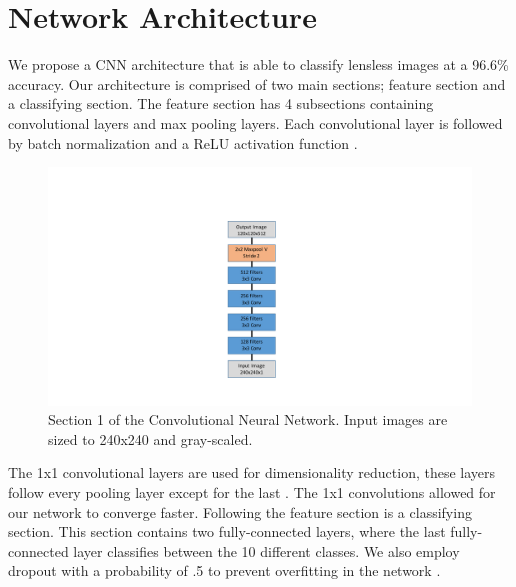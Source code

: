 \documentclass[11pt,conference]{ieeeconf}
\begin{document}
\section{Network Architecture}
We propose a CNN architecture that is able to classify lensless images at a 96.6\% accuracy. Our architecture is comprised of two main sections; feature section and a classifying section. The feature section has 4 subsections containing convolutional layers and max pooling layers. Each convolutional layer is followed by batch normalization and a ReLU activation function \cite{DBLP:journals/corr/IoffeS15, Nair:2010:RLU:3104322.3104425}.
\begin{figure}[H]
\centering
\includegraphics[keepaspectratio=true,scale=0.6]{section1}
\caption{Section 1 of the Convolutional Neural Network. Input images are sized to 240x240 and gray-scaled.}\label{section1}
\end{figure}
 The 1x1 convolutional layers are used for dimensionality reduction, these layers follow every pooling layer except for the last \cite{DBLP:journals/corr/LinCY13}. The 1x1 convolutions allowed for our network to converge faster.
Following the feature section is a classifying section. This section contains two fully-connected layers, where the last fully-connected layer classifies between the 10 different classes. We also employ dropout with a probability of .5 to prevent overfitting in the network \cite{JMLR:v15:srivastava14a}.
%
\end{document}

